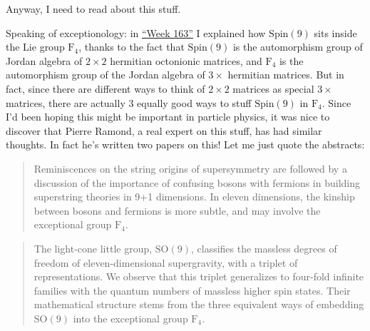 \documentclass{article}
\def\tightlist{}
\renewcommand{\texttt}[1]{%
  \begingroup
  \ttfamily
  \begingroup\lccode`~=`/\lowercase{\endgroup\def~}{/\discretionary{}{}{}}%
  \begingroup\lccode`~=`[\lowercase{\endgroup\def~}{[\discretionary{}{}{}}%
  \begingroup\lccode`~=`.\lowercase{\endgroup\def~}{.\discretionary{}{}{}}%
  \catcode`/=\active\catcode`[=\active\catcode`.=\active
  \scantokens{#1\noexpand}%
  \endgroup
}
\begin{document}
Anyway, I need to read about this stuff.

Speaking of exceptionology: in \protect\hyperlink{week163}{``Week 163''}
I explained how \(\mathrm{Spin}(9)\) sits inside the Lie group
\(\mathrm{F}_4\), thanks to the fact that \(\mathrm{Spin}(9)\) is the
automorphism group of Jordan algebra of \(2\times2\) hermitian
octonionic matrices, and \(\mathrm{F}_4\) is the automorphism group of
the Jordan algebra of \(3\times\) hermitian matrices. But in fact, since
there are different ways to think of \(2\times2\) matrices as special
\(3\times\) matrices, there are actually 3 equally good ways to stuff
\(\mathrm{Spin}(9)\) in \(\mathrm{F}_4\). Since I'd been hoping this
might be important in particle physics, it was nice to discover that
Pierre Ramond, a real expert on this stuff, has had similar thoughts. In
fact he's written two papers on this! Let me just quote the abstracts:


\begin{quote}
Reminiscences on the string origins of supersymmetry are followed by a
discussion of the importance of confusing bosons with fermions in
building superstring theories in 9+1 dimensions. In eleven dimensions,
the kinship between bosons and fermions is more subtle, and may involve
the exceptional group \(\mathrm{F}_4\).
\end{quote}


\begin{quote}
The light-cone little group, \(\mathrm{SO}(9)\), classifies the massless
degrees of freedom of eleven-dimensional supergravity, with a triplet of
representations. We observe that this triplet generalizes to four-fold
infinite families with the quantum numbers of massless higher spin
states. Their mathematical structure stems from the three equivalent
ways of embedding \(\mathrm{SO}(9)\) into the exceptional group
\(\mathrm{F}_4\).
\end{quote}
\end{document}
